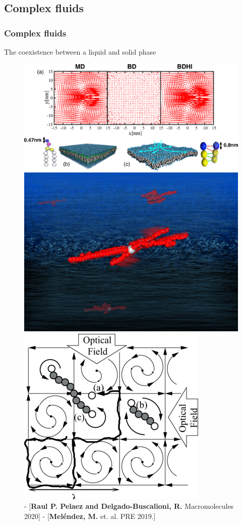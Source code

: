 \documentclass[xcolor=dvipsnames]{beamer}
\begin{document}
\subsection{Complex fluids}
\begin{frame}
  \frametitle{Complex fluids}
\centering \Large  The coexistence between a liquid and solid phase
  \begin{figure}
    \centering
    \includegraphics[width=0.5\linewidth]{membrane}\includegraphics[width=0.2\linewidth]{star}
    \includegraphics[width=0.2\linewidth]{optofluidics}\\
    {\fontsize{4.5}{12}   -  [{\bf Raul P. Pelaez and Delgado-Buscalioni, R.} Macromolecules 2020]    -   [{\bf  Mel\'endez, M.} et. al. PRE 2019.]}\\

\end{figure}
\end{frame}
\end{document}
